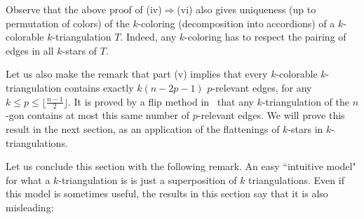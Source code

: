 \documentclass[12pt]{amsart}
\begin{document}
Observe that the above proof of (iv)$\Rightarrow$(vi) also gives uniqueness (up to permutation of colors) of the $k$-coloring (decomposition into accordions)
of a $k$-colorable $k$-triangulation $T$. Indeed, any $k$-coloring has to respect the pairing of edges in all $k$-stars of $T$.

Let us also make the remark that part (v) implies that every $k$-colorable $k$-triangulation contains exactly  $k(n-2p-1)$ $p$-relevant edges, for any $k\le p\le \lfloor\frac{n-1}{2}\rfloor$. It is proved by a flip method in~\cite{n-gdfcp-00} that any $k$-triangulation of the $n$-gon contains at most this same number of $p$-relevant edges. We will prove this result in the next section, as an application of the flattenings of $k$-stars in $k$-triangulations.

Let us conclude this section with the following remark. An easy ``intuitive model" for what a $k$-triangulation is is just a superposition of $k$ triangulations. Even if this model is sometimes useful, the results in this section say that it is also misleading:
\end{document}
